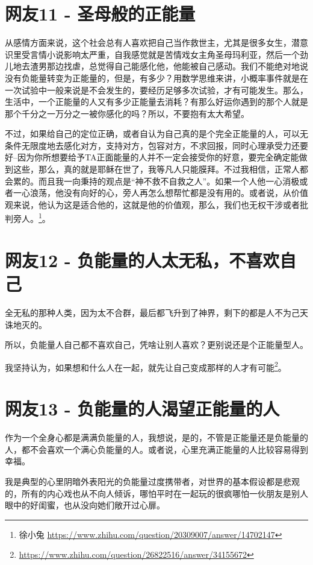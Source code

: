 \section{网友11 - 圣母般的正能量}

从感情方面来说，这个社会总有人喜欢把自己当作救世主，尤其是很多女生，潜意识里受言情小说影响太严重，自我感觉就是苦情戏女主角圣母玛利亚，然后一个劲儿地去渣男那边找虐，总觉得自己能感化他，他能被自己感动。我们不能绝对地说没有负能量转变为正能量的，但是，有多少？用数学思维来讲，小概率事件就是在一次试验中一般来说是不会发生的，要经历足够多次试验，才有可能发生。那么，生活中，一个正能量的人又有多少正能量去消耗？有那么好运你遇到的那个人就是那个千分之一万分之一被你感化的吗？所以，不要抱有太大希望。

不过，如果给自己的定位正确，或者自认为自己真的是个完全正能量的人，可以无条件无限度地去感化对方，支持对方，包容对方，不求回报，同时心理承受力还要好--因为你所想要给予TA正面能量的人并不一定会接受你的好意，要完全确定能做到这些，那么，真的就是耶稣在世了，我等凡人只能膜拜。不过我相信，正常人都会累的。而且我一向秉持的观点是“神不救不自救之人”。如果一个人他一心消极或者一心浪荡，他没有向好的心，旁人再怎么想帮忙都是没有用的。或者说，从价值观来说，他认为这是适合他的，这就是他的价值观，那么，我们也无权干涉或者批判旁人。\footnote{徐小兔 \quad \url{https://www.zhihu.com/question/20309007/answer/14702147}}。

\section{网友12 - 负能量的人太无私，不喜欢自己}

全无私的那种人类，因为太不合群，最后都飞升到了神界，剩下的都是人不为己天诛地灭的。

所以，负能量人自己都不喜欢自己，凭啥让别人喜欢？更别说还是个正能量型人。

我坚持认为，如果想和什么人在一起，就先让自己变成那样的人才有可能\footnote{\url{https://www.zhihu.com/question/26822516/answer/34155672}}。

\section{网友13 - 负能量的人渴望正能量的人}

作为一个全身心都是满满负能量的人，我想说，是的，不管是正能量还是负能量的人，都不会喜欢一个满心负能量的人。或者说，心里充满正能量的人比较容易得到幸福。

我是典型的心里阴暗外表阳光的负能量过度携带者，对世界的基本假设都是悲观的，所有的内心戏也从不向人倾诉，哪怕平时在一起玩的很疯哪怕一伙朋友是别人眼中的好闺蜜，也从没向她们敞开过心扉。

